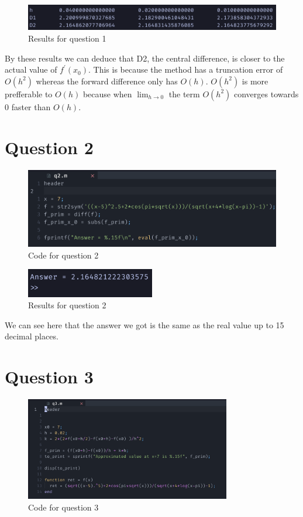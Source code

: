 \documentclass{article}
\begin{document}
\begin{figure}[h]
	\centering
	\includegraphics[width=\textwidth]{imgs/q1_results.png}
	\caption{Results for question 1}
	\label{fig:q1_results}
\end{figure}

By these results we can deduce that D2, the central difference, is closer to the actual value of $f^\prime(x_0)$. This is because the method has a
truncation error of $O(h^2)$ whereas the forward difference only has $O(h)$. $O(h^{2})$ is more prefferable to $O(h)$ because when $\lim_{h \to 0}$ the term $O(h^{2})$ converges towards $0$ faster than $O(h)$.

\newpage
\section{Question 2}
\begin{figure}[H]
	\centering
	\includegraphics[width=\textwidth{}]{imgs/q2_code.png}
	\caption{Code for question 2}
	\label{fig:q2_code}
\end{figure}

\begin{figure}[H]
	\centering
	\includegraphics[width=0.5\textwidth]{imgs/q2_results.png}
	\caption{Results for question 2}
	\label{fig:q2_results}
\end{figure}

We can see here that the answer we got is the same as the real value up to 15 decimal places.

\newpage
\section{Question 3}
\begin{figure}[H]
	\centering
	\includegraphics[width=0.8\textwidth]{imgs/q3_code.png}
	\caption{Code for question 3}
	\label{fig:q3_code}
\end{figure}
\end{document}
